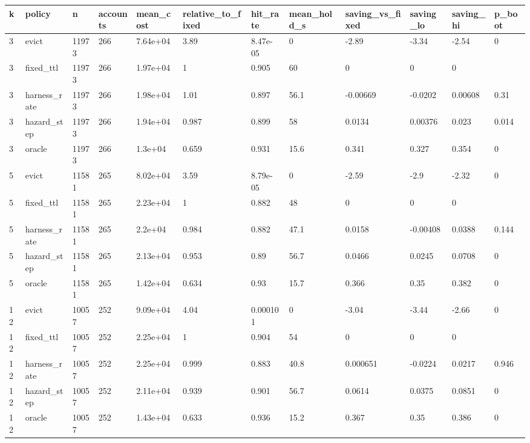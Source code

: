 \begin{tabular}{llllllllllll}
\toprule
k & policy & n & accounts & mean\_cost & relative\_to\_fixed & hit\_rate & mean\_hold\_s & saving\_vs\_fixed & saving\_lo & saving\_hi & p\_boot \\
\midrule
3 & evict & 11973 & 266 & 7.64e+04 & 3.89 & 8.47e-05 & 0 & -2.89 & -3.34 & -2.54 & 0 \\
3 & fixed\_ttl & 11973 & 266 & 1.97e+04 & 1 & 0.905 & 60 & 0 & 0 & 0 &  \\
3 & harness\_rate & 11973 & 266 & 1.98e+04 & 1.01 & 0.897 & 56.1 & -0.00669 & -0.0202 & 0.00608 & 0.31 \\
3 & hazard\_step & 11973 & 266 & 1.94e+04 & 0.987 & 0.899 & 58 & 0.0134 & 0.00376 & 0.023 & 0.014 \\
3 & oracle & 11973 & 266 & 1.3e+04 & 0.659 & 0.931 & 15.6 & 0.341 & 0.327 & 0.354 & 0 \\
5 & evict & 11581 & 265 & 8.02e+04 & 3.59 & 8.79e-05 & 0 & -2.59 & -2.9 & -2.32 & 0 \\
5 & fixed\_ttl & 11581 & 265 & 2.23e+04 & 1 & 0.882 & 48 & 0 & 0 & 0 &  \\
5 & harness\_rate & 11581 & 265 & 2.2e+04 & 0.984 & 0.882 & 47.1 & 0.0158 & -0.00408 & 0.0388 & 0.144 \\
5 & hazard\_step & 11581 & 265 & 2.13e+04 & 0.953 & 0.89 & 56.7 & 0.0466 & 0.0245 & 0.0708 & 0 \\
5 & oracle & 11581 & 265 & 1.42e+04 & 0.634 & 0.93 & 15.7 & 0.366 & 0.35 & 0.382 & 0 \\
12 & evict & 10057 & 252 & 9.09e+04 & 4.04 & 0.000101 & 0 & -3.04 & -3.44 & -2.66 & 0 \\
12 & fixed\_ttl & 10057 & 252 & 2.25e+04 & 1 & 0.904 & 54 & 0 & 0 & 0 &  \\
12 & harness\_rate & 10057 & 252 & 2.25e+04 & 0.999 & 0.883 & 40.8 & 0.000651 & -0.0224 & 0.0217 & 0.946 \\
12 & hazard\_step & 10057 & 252 & 2.11e+04 & 0.939 & 0.901 & 56.7 & 0.0614 & 0.0375 & 0.0851 & 0 \\
12 & oracle & 10057 & 252 & 1.43e+04 & 0.633 & 0.936 & 15.2 & 0.367 & 0.35 & 0.386 & 0 \\
\bottomrule
\end{tabular}